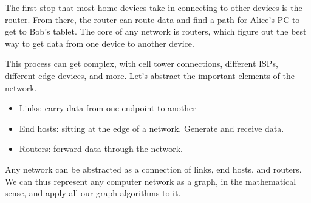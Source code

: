 The first stop that most home devices take in connecting to other
devices is the router. From there, the router can route data and
find a path for Alice's PC to get to Bob's tablet. The core of any
network is routers, which figure out the best way to get data from
one device to another device.

This process can get complex, with cell tower connections, different ISPs,
different edge devices, and more. Let's abstract the important elements
of the network.

\begin{itemize}
    \item Links: carry data from one endpoint to another
    \item End hosts: sitting at the edge of a network. Generate and receive data.
    \item Routers: forward data through the network.
\end{itemize}

Any network can be abstracted as a connection of links, end hosts, and routers.
We can thus represent any computer network as a graph, in the mathematical
sense, and apply all our graph algorithms to it.